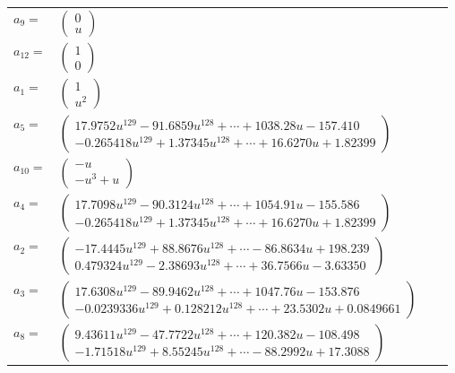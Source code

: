 \documentclass[1p]{elsarticle_modified}
\theoremstyle{definition}
\begin{document}
\begin{tabular}{m{7pt} m{180pt} m{7pt} m{180pt} }
\flushright $a_{9}=$&$\begin{pmatrix}0\\u\end{pmatrix}$ \\
\flushright $a_{12}=$&$\begin{pmatrix}1\\0\end{pmatrix}$ \\
\flushright $a_{1}=$&$\begin{pmatrix}1\\u^2\end{pmatrix}$ \\
\flushright $a_{5}=$&$\begin{pmatrix}17.9752 u^{129}-91.6859 u^{128}+\cdots+1038.28 u-157.410\\-0.265418 u^{129}+1.37345 u^{128}+\cdots+16.6270 u+1.82399\end{pmatrix}$ \\
\flushright $a_{10}=$&$\begin{pmatrix}- u\\- u^3+u\end{pmatrix}$ \\
\flushright $a_{4}=$&$\begin{pmatrix}17.7098 u^{129}-90.3124 u^{128}+\cdots+1054.91 u-155.586\\-0.265418 u^{129}+1.37345 u^{128}+\cdots+16.6270 u+1.82399\end{pmatrix}$ \\
\flushright $a_{2}=$&$\begin{pmatrix}-17.4445 u^{129}+88.8676 u^{128}+\cdots-86.8634 u+198.239\\0.479324 u^{129}-2.38693 u^{128}+\cdots+36.7566 u-3.63350\end{pmatrix}$ \\
\flushright $a_{3}=$&$\begin{pmatrix}17.6308 u^{129}-89.9462 u^{128}+\cdots+1047.76 u-153.876\\-0.0239336 u^{129}+0.128212 u^{128}+\cdots+23.5302 u+0.0849661\end{pmatrix}$ \\
\flushright $a_{8}=$&$\begin{pmatrix}9.43611 u^{129}-47.7722 u^{128}+\cdots+120.382 u-108.498\\-1.71518 u^{129}+8.55245 u^{128}+\cdots-88.2992 u+17.3088\end{pmatrix}$ \\

\end{tabular}
\end{document}
